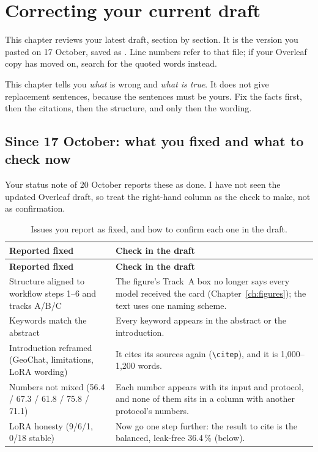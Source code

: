 \chapter{Correcting your current draft}
\label{ch:draft}

This chapter reviews your latest draft, section by section. It is the version you pasted on 17 October, saved as . Line numbers refer to that file; if your Overleaf copy has moved on, search for the quoted words instead.

\begin{watchout}
This chapter tells you \emph{what} is wrong and \emph{what is true}. It does not give replacement sentences, because the sentences must be yours. Fix the facts first, then the citations, then the structure, and only then the wording.
\end{watchout}

\section{Since 17 October: what you fixed and what to check now}

Your status note of 20 October reports these as done. I have not seen the updated Overleaf draft, so treat the right-hand column as the check to make, not as confirmation.

\begin{longtable}{L{5.6cm}L{8.6cm}}
\caption{Issues you report as fixed, and how to confirm each one in the draft.}\label{tab:fixed}\\
\toprule
\textbf{Reported fixed} & \textbf{Check in the draft} \\
\midrule
\endfirsthead
\toprule
\textbf{Reported fixed} & \textbf{Check in the draft} \\
\midrule
\endhead
Structure aligned to workflow steps 1--6 and tracks A/B/C & The figure's Track~A box no longer says every model received the card (Chapter~\ref{ch:figures}); the text uses one naming scheme. \\
Keywords match the abstract & Every keyword appears in the abstract or the introduction. \\
Introduction reframed (GeoChat, limitations, LoRA wording) & It cites its sources again (\texttt{\textbackslash citep}), and it is 1,000--1,200 words. \\
Numbers not mixed (56.4 / 67.3 / 61.8 / 75.8 / 71.1) & Each number appears with its input and protocol, and none of them sits in a column with another protocol's numbers. \\
LoRA honesty (9/6/1, 0/18 stable) & Now go one step further: the result to cite is the balanced, leak-free 36.4\,\% (below). \\
\bottomrule
\end{longtable}

